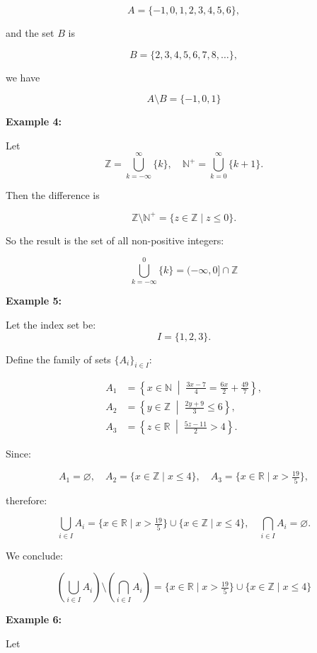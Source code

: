 \documentclass[12pt,a4paper,openany]{article}
\begin{document}
\[
A = \{-1, 0, 1, 2, 3, 4, 5, 6\},
\]

and the set $B$ is

\[
B = \{2, 3, 4, 5, 6, 7, 8, \dots\},
\]

we have

\[
\boxed{A \setminus B = \{-1, 0, 1\}}
\]

\textbf{Example 4:}

Let  
\[
\mathbb{Z} = \displaystyle\bigcup_{k=-\infty}^{\infty} \{k\}, 
\quad 
\mathbb{N}^+ = \bigcup_{k=0}^{\infty} \{k+1\}.
\]

Then the difference is  

\[
\mathbb{Z} \setminus \mathbb{N}^+ = \{ z \in \mathbb{Z} \mid z \le 0 \}.
\]

So the result is the set of all non-positive integers:

\[
\boxed{\displaystyle\bigcup_{k=-\infty}^{0} \{k\} = (-\infty, 0] \cap \mathbb{Z}}
\]

\textbf{Example 5:}

Let the index set be:
\[
I = \{1,2,3\}.
\]

Define the family of sets $\{A_i\}_{i \in I}$:

\[
\begin{aligned}
A_1 &= \left\{ x \in \mathbb{N} \;\middle|\; \frac{3x-7}{4} = \frac{6x}{2} + \frac{49}{7} \right\}, \\
A_2 &= \left\{ y \in \mathbb{Z} \;\middle|\; \frac{2y+9}{3} \le 6 \right\}, \\
A_3 &= \left\{ z \in \mathbb{R} \;\middle|\; \frac{5z-11}{2} > 4 \right\}.
\end{aligned}
\]

Since:

\[
A_1 = \varnothing, \quad 
A_2 = \{ x \in \mathbb{Z} \mid x \le 4 \}, \quad 
A_3 = \{ x \in \mathbb{R} \mid x > \tfrac{19}{5} \},
\]

therefore:

\[
\displaystyle\bigcup_{i \in I} A_i = \{ x \in \mathbb{R} \mid x > \tfrac{19}{5} \} \cup \{ x \in \mathbb{Z} \mid x \le 4 \}, \quad
\bigcap_{i \in I} A_i = \varnothing.
\]

We conclude:

\[
\boxed{\left( \displaystyle\bigcup_{i \in I} A_i \right) \setminus \left( \bigcap_{i \in I} A_i \right) = \{ x \in \mathbb{R} \mid x > \tfrac{19}{5} \} \cup \{ x \in \mathbb{Z} \mid x \le 4 \}}
\]

\textbf{Example 6:}

Let
\end{document}

